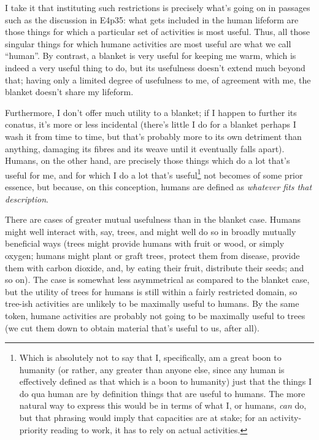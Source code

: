 \documentclass{article}
\newcommand{\dash}{\unskip{—}}
\begin{document}
I take it that instituting such restrictions is precisely what's going on in passages such as the discussion in E4p35: what gets included in the human lifeform are those things for which a particular set of activities is most useful. Thus, all those singular things for which humane activities are most useful are what we call \enquote{human}. By contrast, a blanket is very useful for keeping me warm, which is indeed a very useful thing to do, but its usefulness doesn't extend much beyond that; having only a limited degree of usefulness to me, of agreement with me, the blanket doesn't share my lifeform.

Furthermore, I don't offer much utility to a blanket; if I happen to further its conatus, it's more or less incidental (there's little I do for a blanket \dash perhaps I wash it from time to time, but that's probably more to its own detriment than anything, damaging its fibres and its weave until it eventually falls apart). Humans, on the other hand, are precisely those things which do a lot that's useful for me, and for which I do a lot that's useful\footnote{Which is absolutely not to say that I, specifically, am a great boon to humanity (or rather, any greater than anyone else, since any human is effectively defined as that which is a boon to humanity) \dash just that the things I do qua human are by definition things that are useful to humans. The more natural way to express this would be in terms of what I, or humans, \emph{can} do, but that phrasing would imply that capacities are at stake; for an activity-priority reading to work, it has to rely on actual activities.} \dash not becomes of some prior essence, but because, on this conception, humans are defined as \emph{whatever fits that description}.

There are cases of greater mutual usefulness than in the blanket case. Humans might well interact with, say, trees, and might well do so in broadly mutually beneficial ways (trees might provide humans with fruit or wood, or simply oxygen; humans might plant or graft trees, protect them from disease, provide them with carbon dioxide, and, by eating their fruit, distribute their seeds; and so on). The case is somewhat less asymmetrical as compared to the blanket case, but the utility of trees for humans is still within a fairly restricted domain, so tree-ish activities are unlikely to be maximally useful to humans. By the same token, humane activities are probably not going to be maximally useful to trees (we cut them down to obtain material that's useful to us, after all).
\end{document}
